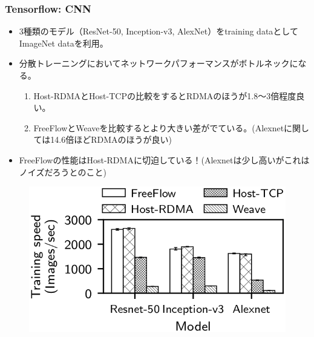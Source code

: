 \documentclass[dvipdfmx,9pt,notheorems]{beamer}
\theoremstyle{definition}
\begin{document}
\begin{frame}\frametitle{Tensorflow: CNN}
	\begin{itemize}
		\item 3種類のモデル（ResNet-50, Inception-v3, AlexNet）をtraining dataとしてImageNet dataを利用。
		\item 分散トレーニングにおいてネットワークパフォーマンスがボトルネックになる。
		\begin{enumerate}
			\item Host-RDMAとHost-TCPの比較をするとRDMAのほうが1.8〜3倍程度良い。
			\item FreeFlowとWeaveを比較するとより大きい差がでている。(Alexnetに関しては14.6倍ほどRDMAのほうが良い)
		\end{enumerate}
		\item FreeFlowの性能はHost-RDMAに切迫している！(Alexnetは少し高いがこれはノイズだろうとのこと)
	\end{itemize}
  \begin{figure}[htb]
    \centering
		\includegraphics[scale=1]{fig/figure15-a.png}
  \end{figure}
\end{frame}
\end{document}
